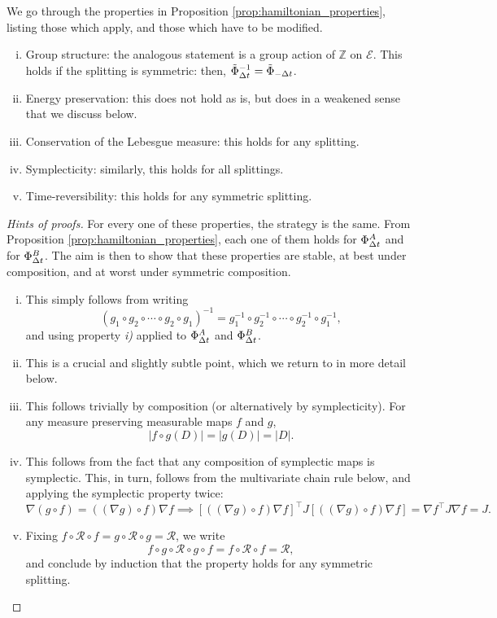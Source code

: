     \begin{prop}
        \label{prop:properties_of_splitting_schemes}
        We go through the properties in Proposition \ref{prop:hamiltonian_properties}, listing those which apply, and those which have to be modified.
        \begin{enumerate}[i)]
            \item Group structure: the analogous statement is a group action of $\mathbb{Z}$ on $\mathcal E$. This holds if the splitting is symmetric: then, $\tilde\Phi_{{\Delta t}}^{-1}=\tilde\Phi_{-{\Delta t}}$.
            \item Energy preservation: this does not hold as is, but does in a weakened sense that we discuss below.
            \item Conservation of the Lebesgue measure: this holds for any splitting.
            \item Symplecticity: similarly, this holds for all splittings.
            \item Time-reversibility: this holds for any symmetric splitting.
        \end{enumerate}
    \end{prop}
    \begin{proof}[Hints of proofs]
        For every one of these properties, the strategy is the same. From Proposition \ref{prop:hamiltonian_properties}, each one of them holds for $\Phi_{{\Delta t}}^A$ and for $\Phi_{{\Delta t}}^B$.
        The aim is then to show that these properties are stable, at best under composition, and at worst under symmetric composition.
        \begin{enumerate}[i)]
            \item This simply follows from writing \[\left(g_1 \circ g_2 \circ \dotsm \circ g_2\circ g_1\right)^{-1}=g_1^{-1}\circ g_2^{-1}\circ \dotsm \circ g_2^{-1}\circ g_1^{-1},\] and using property \textit{i)} applied to $\Phi_{{\Delta t}}^A$ and $\Phi_{{\Delta t}}^B$.
            \item This is a crucial and slightly subtle point, which we return to in more detail below.
            \item This follows trivially by composition (or alternatively by symplecticity). For any measure preserving measurable maps $f$ and $g$, \[|f \circ g(D)|=|g(D)|=|D|.\] 
            \item This follows from the fact that any composition of symplectic maps is symplectic. This, in turn, follows from the multivariate chain rule below, and applying the symplectic property twice: \[\nabla(g\circ f)= \left((\nabla g)\circ f\right)\nabla f\implies \left[\left((\nabla g)\circ f\right)\nabla f\right]^\intercal J\left[\left((\nabla g)\circ f\right)\nabla f\right]=\nabla f^\intercal J \nabla f=J.\]
            \item Fixing $f \circ \mathcal R \circ f = g \circ \mathcal R \circ g = \mathcal R$, we write \[f\circ g \circ \mathcal R \circ g \circ f = f \circ \mathcal R \circ f = \mathcal R,\] and conclude by induction that the property holds for any symmetric splitting.
        \end{enumerate}
    \end{proof}

